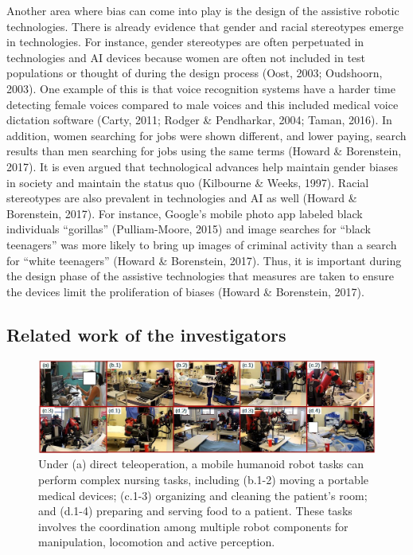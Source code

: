 Another area where bias can come into play is the design of the assistive robotic technologies.  There is already evidence that gender and racial stereotypes emerge in technologies.  For instance, gender stereotypes are often perpetuated in technologies and AI devices because women are often not included in test populations or thought of during the design process (Oost, 2003; Oudshoorn, 2003).  One example of this is that voice recognition systems have a harder time detecting female voices compared to male voices and this included medical voice dictation software (Carty, 2011; Rodger \& Pendharkar, 2004; Taman, 2016).  In addition, women searching for jobs were shown different, and lower paying, search results than men searching for jobs using the same terms (Howard \& Borenstein, 2017).  It is even argued that technological advances help maintain gender biases in society and maintain the status quo (Kilbourne \& Weeks, 1997).  Racial stereotypes are also prevalent in technologies and AI as well (Howard \& Borenstein, 2017).  For instance, Google’s mobile photo app labeled black individuals “gorillas” (Pulliam-Moore, 2015) and image searches for “black teenagers” was more likely to bring up images of criminal activity than a search for “white teenagers” (Howard \& Borenstein, 2017).   Thus, it is important during the design phase of the assistive technologies that measures are taken to ensure the devices limit the proliferation of biases (Howard \& Borenstein, 2017).  

\subsection{Related work of the investigators}

\begin{figure}[h!!]
\centering
\includegraphics[width=0.99\linewidth]{fig//NursingTask}
\caption{Under (a) direct teleoperation, a mobile humanoid robot tasks can perform complex nursing tasks, including (b.1-2) moving a portable medical devices; (c.1-3) organizing and cleaning the patient's room; and (d.1-4) preparing and serving food to a patient. These tasks involves the coordination among multiple robot components for manipulation, locomotion and active perception.}
\label{NursingTask}
\vspace{1ex}
\end{figure}

